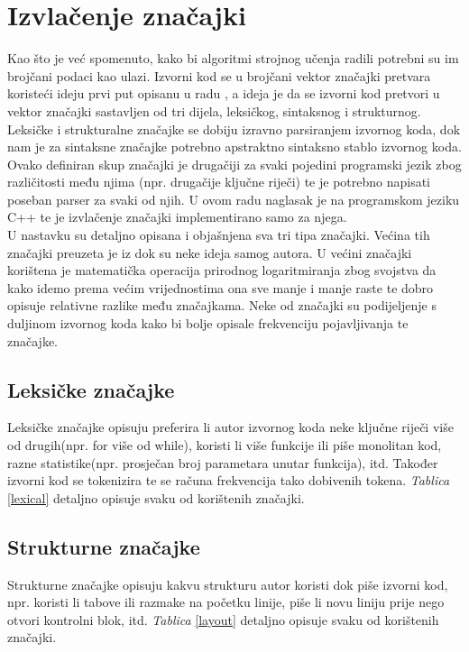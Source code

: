 \section{Izvlačenje značajki} \label{sec:fe}
Kao što je već spomenuto, kako bi algoritmi strojnog učenja radili potrebni su im brojčani podaci kao ulazi. Izvorni kod se u brojčani vektor značajki pretvara koristeći ideju prvi put opisanu u radu \cite{islam}, a ideja je da se izvorni kod pretvori u vektor značajki sastavljen od tri dijela, leksičkog, sintaksnog i strukturnog. Leksičke i strukturalne značajke se dobiju izravno parsiranjem izvornog koda, dok nam je za sintaksne značajke potrebno apstraktno sintaksno stablo izvornog koda. Ovako definiran skup značajki je drugačiji za svaki pojedini programski jezik zbog različitosti među njima (npr. drugačije ključne riječi) te je potrebno napisati poseban parser za svaki od njih. U ovom radu naglasak je na programskom jeziku C++ te je izvlačenje značajki implementirano samo za njega. \\

	U nastavku su detaljno opisana i objašnjena sva tri tipa značajki. Većina tih značajki preuzeta je iz \cite{islam} dok su neke ideja samog autora. U većini značajki korištena je matematička operacija prirodnog logaritmiranja zbog svojstva da kako idemo prema većim vrijednostima ona sve manje i manje raste te dobro opisuje relativne razlike među značajkama. Neke od značajki su podijeljenje s duljinom izvornog koda kako bi bolje opisale frekvenciju pojavljivanja te značajke. 

\subsection{Leksičke značajke}
Leksičke značajke opisuju preferira li autor izvornog koda neke ključne riječi više od drugih(npr. for više od while), koristi li više funkcije ili piše monolitan kod, razne statistike(npr. prosječan broj parametara unutar funkcija), itd. Također izvorni kod se tokenizira te se računa frekvencija tako dobivenih tokena. \textit{Tablica} \ref{lexical} detaljno opisuje svaku od korištenih značajki. 

\subsection{Strukturne značajke}
Strukturne značajke opisuju kakvu strukturu autor koristi dok piše izvorni kod, npr. koristi li tabove ili razmake na početku linije, piše li novu liniju prije nego otvori kontrolni blok, itd. \textit{Tablica} \ref{layout} detaljno opisuje svaku od korištenih značajki.

